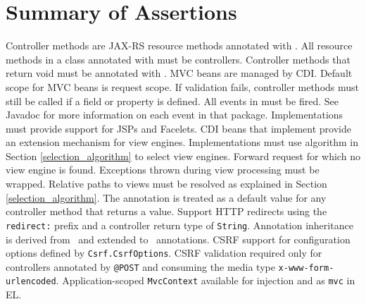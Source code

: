 \chapter{Summary of Assertions}
\label{assertions}

\begin{description}
 Controller methods are JAX-RS resource methods annotated with .
 All resource methods in a class annotated with  must
be controllers.
 Controller methods that return void must be annotated with .
 MVC beans are managed by CDI.
 Default scope for MVC beans is request scope.
 If validation fails, controller methods must still be called if a 
 field or property is defined. 
 All events in  must be fired. See Javadoc for more
information on each event in that package.
 Implementations must provide support for JSPs and Facelets.
 CDI beans that implement  provide
an extension mechanism for view engines.
 Implementations must use algorithm in Section \ref{selection_algorithm} 
to select view engines.
 Forward request for which no view engine is found.
 Exceptions thrown during view processing must be wrapped.
 Relative paths to views must be resolved as explained in 
Section \ref{selection_algorithm}.
 The  annotation is treated as a default value for any controller 
method that returns a  value.
 Support HTTP redirects using the {\tt redirect:} prefix and a controller
return type of {\tt String}.
 Annotation inheritance is derived from \jaxrs\  and extended to 
\mvc\ annotations. 
 CSRF support for configuration options defined by {\tt Csrf.CsrfOptions}.
 CSRF validation required only for controllers annotated by {\tt @POST} 
and consuming the media type {\tt x-www-form-urlencoded}.
 Application-scoped {\tt MvcContext} available for injection and as {\tt mvc} in EL.
\end{description}
